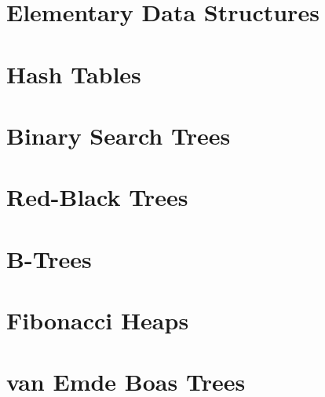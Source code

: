 		\section{Elementary Data Structures}

		\section{Hash Tables}

		\section{Binary Search Trees}

		\section{Red-Black Trees}

		\section{B-Trees}

		\section{Fibonacci Heaps}

		\section{van Emde Boas Trees}
